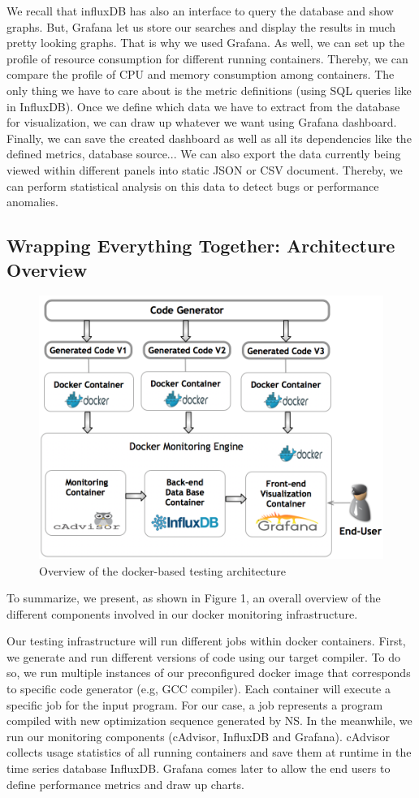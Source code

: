 We recall that influxDB has also an interface to query the database and show graphs. But, Grafana let us store our searches and display the results in much pretty looking graphs. That is why we used Grafana.
As well, we can set up the profile of resource consumption for different running
containers. Thereby, we can compare the profile of CPU and memory consumption among containers. The only thing we have to care about is the metric definitions (using SQL queries like in InfluxDB). Once we define which data we have to extract from the database for visualization, we can draw up whatever we want using Grafana dashboard. Finally, we can save the created dashboard as well as all its dependencies like the defined metrics, database source... We can also export the data currently being viewed within different
panels into static JSON or CSV document. Thereby, we can perform statistical analysis on this data to detect bugs or performance anomalies.

\subsection{Wrapping Everything Together: Architecture Overview}
\begin{figure}[b!]
	\includegraphics[scale=0.48]{Ressources/infra.png}
	\caption{Overview of the docker-based testing architecture}
\end{figure}

To summarize, we present, as shown in Figure 1, an overall overview of the different components involved in our docker monitoring infrastructure.

Our testing infrastructure will run different jobs within docker containers. First, we generate and run different versions of code using our target compiler. To do so, we run multiple instances of our preconfigured docker image that corresponds to specific code generator (e.g, GCC compiler). Each container will execute a specific job for the input program. For our case, a job represents a program compiled with new optimization sequence generated by NS. In the meanwhile, we run our monitoring components (cAdvisor, InfluxDB and Grafana). cAdvisor collects usage statistics of all running containers and save them at runtime in the time series database InfluxDB. Grafana comes later to allow the end users to define performance metrics and draw up charts.
